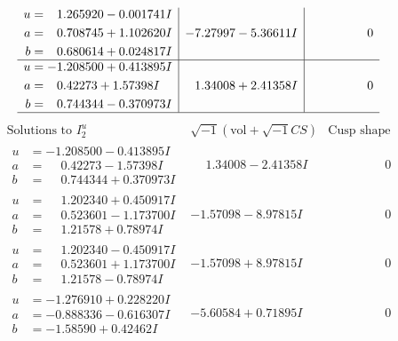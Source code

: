 \documentclass[1p]{elsarticle_modified}
\theoremstyle{definition}
\newcommand{\I}{\sqrt{-1}}
\begin{document}
$$\begin{array}{c|c|c}
\begin{aligned}
u &= \phantom{-}1.265920 - 0.001741 I \\
a &= \phantom{-}0.708745 + 1.102620 I \\
b &= \phantom{-}0.680614 + 0.024817 I\end{aligned}
 & -7.27997 - 5.36611 I & \phantom{-0.000000 } 0 \\ \hline\begin{aligned}
u &= -1.208500 + 0.413895 I \\
a &= \phantom{-}0.42273 + 1.57398 I \\
b &= \phantom{-}0.744344 - 0.370973 I\end{aligned}
 & \phantom{-}1.34008 + 2.41358 I & \phantom{-0.000000 } 0\\
 \hline 
 \end{array}$$\newpage$$\begin{array}{c|c|c}  
\text{Solutions to }I^u_{2}& \I (\text{vol} + \sqrt{-1}CS) & \text{Cusp shape}\\
 \hline 
\begin{aligned}
u &= -1.208500 - 0.413895 I \\
a &= \phantom{-}0.42273 - 1.57398 I \\
b &= \phantom{-}0.744344 + 0.370973 I\end{aligned}
 & \phantom{-}1.34008 - 2.41358 I & \phantom{-0.000000 } 0 \\ \hline\begin{aligned}
u &= \phantom{-}1.202340 + 0.450917 I \\
a &= \phantom{-}0.523601 - 1.173700 I \\
b &= \phantom{-}1.21578 + 0.78974 I\end{aligned}
 & -1.57098 - 8.97815 I & \phantom{-0.000000 } 0 \\ \hline\begin{aligned}
u &= \phantom{-}1.202340 - 0.450917 I \\
a &= \phantom{-}0.523601 + 1.173700 I \\
b &= \phantom{-}1.21578 - 0.78974 I\end{aligned}
 & -1.57098 + 8.97815 I & \phantom{-0.000000 } 0 \\ \hline\begin{aligned}
u &= -1.276910 + 0.228220 I \\
a &= -0.888336 - 0.616307 I \\
b &= -1.58590 + 0.42462 I\end{aligned}
 & -5.60584 + 0.71895 I & \phantom{-0.000000 } 0 \\ \hline\begin{aligned}

\end{aligned}
\end{array}$$
\end{document}

